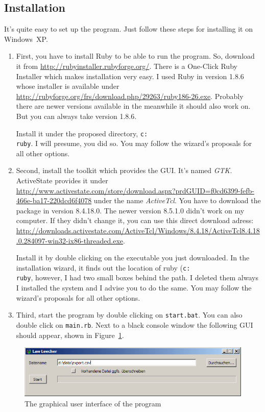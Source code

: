 \documentclass{scrartcl}
\begin{document}
\subsection{Installation}
It's quite easy to set up the program. Just follow these steps for installing it on Windows~XP.
\begin{enumerate}
  \item First, you have to install Ruby to be able to run the program. So, download it from \url{http://rubyinstaller.rubyforge.org/}. There is a One-Click Ruby Installer which makes installation very easy. I used Ruby in version 1.8.6 whose installer is available under \url{http://rubyforge.org/frs/download.php/29263/ruby186-26.exe}. Probably there are newer versions available in the meanwhile it should also work on. But you can always take version 1.8.6.
  
  Install it under the proposed directory, \texttt{c:\\ruby}. I will presume, you did so. You may follow the wizard's proposals for all other options.

  \item Second, install the toolkit which provides the GUI. It's named \textit{GTK}. ActiveState provides it under \url{http://www.activestate.com/store/download.aspx?prdGUID=f0cd6399-fefb-466e-ba17-220dcd6f4078} under the name \textit{ActiveTcl}. You have to download the package in version 8.4.18.0. The newer version 8.5.1.0 didn't work on my computer. If they didn't change it, you can use this direct download adress: \url{http://downloads.activestate.com/ActiveTcl/Windows/8.4.18/ActiveTcl8.4.18.0.284097-win32-ix86-threaded.exe}.
  
  Install it by double clicking on the executable you just downloaded. In the installation wizard, it finds out the location of ruby (\texttt{c:\\ruby}, however, I had two small boxes behind the path. I deleted them always I installed the system and I advise you to do the same. You may follow the wizard's proposals for all other options.


  \item Third, start the program by double clicking on \texttt{start.bat}. You can also double click on \texttt{main.rb}. Next to a black console window the following GUI should appear, shown in Figure~\ref{GUI}.
\end{enumerate}

  \begin{figure}[ht]
  \begin{center}
  \includegraphics[width = \textwidth]{GUI.png}
  \caption{The graphical user interface of the program}
  \label{GUI}
  \end{center}
  \end{figure}
\end{document}

